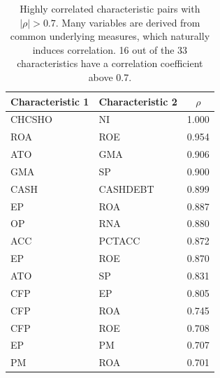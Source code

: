\begin{table}[H]
\centering
\caption{Highly correlated characteristic pairs with $|\rho|>0.7$. Many variables are derived from common underlying measures, which naturally induces correlation. 16 out of the 33 characteristics have a correlation coefficient above 0.7.}
\label{tab:high_correlations}
\begin{tabular}{llc}
\toprule
Characteristic 1 & Characteristic 2 & $\rho$ \\
\midrule
CHCSHO & NI & 1.000 \\
ROA & ROE & 0.954 \\
ATO & GMA & 0.906 \\
GMA & SP & 0.900 \\
CASH & CASHDEBT & 0.899 \\
EP & ROA & 0.887 \\
OP & RNA & 0.880 \\
ACC & PCTACC & 0.872 \\
EP & ROE & 0.870 \\
ATO & SP & 0.831 \\
CFP & EP & 0.805 \\
CFP & ROA & 0.745 \\
CFP & ROE & 0.708 \\
EP & PM & 0.707 \\
PM & ROA & 0.701 \\
\bottomrule
\end{tabular}
\end{table}
